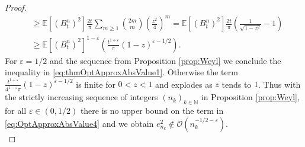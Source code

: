 \documentclass[a4paper,11pt,reqno]{amsart}
\theoremstyle{plain}
\def\N{\mathbb{N}}
\def\Oo{\mathcal{O}}
\def\ex{\mathbb{E}}
\def\ve{\varepsilon}
\numberwithin{equation}{section}
\begin{document}
\begin{proof}
\begin{align}
&\geq \ex[(B^n_t)^2] \frac{2t}{\pi} \sum\limits_{m \geq 1} \binom{2m}{m}\left(\frac{z^2}{4}\right)^m = \ex[(B^n_t)^2] \frac{2t}{\pi} \left(\frac{1}{\sqrt{1-z^2}}- 1\right)\nonumber\\
&\geq
\ex[(B^n_t)^2]^{1-\ve} \left(\frac{t^{1+\ve}}{\pi} (1-z)^{\ve-1/2}\right).\label{eq:OptApproxAbsValue4}
\end{align}
For $\ve =1/2$ and the sequence from Proposition \ref{prop:Weyl} we conclude the inequality in \eqref{eq:thmOptApproxAbsValue1}. Otherwise the term $\frac{t^{1+\ve}}{4^{1-\ve}\pi} (1-z)^{\ve-1/2}$ is finite for $0<z<1$ and explodes as $z$ tends to $1$. Thus with the strictly increasing sequence of integers $(n_k)_{k \in \N}$ in Proposition \ref{prop:Weyl}, for all $\ve \in (0,1/2)$ there is no upper bound on the term in \eqref{eq:OptApproxAbsValue4} and we obtain $e_{n_k}^2 \notin\Oo(n_k^{-1/2-\ve})$.\\


\end{proof}
\end{document}
